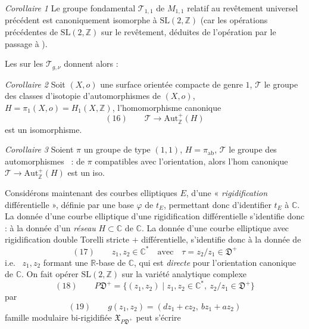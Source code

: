 \documentclass[11pt,a4paper]{article}
\begin{document}
\emph{Corollaire 1} Le groupe fondamental $\mathcal{T}_{1,1}$ de $M_{1,1}$
relatif au revêtement universel précédent est canoniquement isomorphe à
$\mathrm{SL}(2,\mathbb{Z})$ (car les opérations précédentes 
de $\mathrm{SL}(2,\mathbb{Z})$ sur le revêtement, déduites de l'opération
\ill{} par le passage à \ill{}).

Les \ill{} sur les $\mathcal{T}_{g,\nu}$ donnent alors :

\emph{Corollaire 2} Soit $(X, o)$ une surface orientée compacte de genre $1$,
$\mathcal{T}$ le groupe des classes d'isotopie d'automorphismes de $(X, o)$,
$H = \pi_1(X, o) = H_1(X, \mathbb{Z})$, 
 l'homomorphisme canonique
\[
(16)\qquad \mathcal{T} \longrightarrow \mathrm{Aut}^+_{\mathbb{Z}}(H)
\]
est un isomorphisme.

\emph{Corollaire 3} Soient $\pi$ un groupe \ill{} de type $(1,1)$,
$H = \pi_{\mathrm{ab}}$, $\mathcal{T}$ le groupe des automorphismes \ :
\ill{} de $\pi$ compatibles avec l'orientation, alors l'hom canonique
$\mathcal{T} \longrightarrow \mathrm{Aut}^+_{\mathbb{Z}}(H)$ est un iso.


Considérons maintenant des courbes elliptiques $E$, 
d'une « \emph{rigidification} différentielle », définie par une base
$\varphi$ de $t_E$, permettant donc d'identifier $t_E$ à $\mathbb{C}$. La donnée
d'une courbe elliptique  d'une rigidification différentielle
s'identifie donc : à la donnée d'un \emph{réseau} $H \subset \mathbb{C}$ de
$\mathbb{C}$. La donnée d'une courbe elliptique avec rigidification double Torelli
stricte $+$ différentielle, s'identifie donc à la donnée de
\[
(17)\qquad z_1, z_2 \in \mathbb{C}^* \quad \text{avec}\quad \tau = z_2/z_1 \in \mathfrak{D}^+
\]
i.e.\  $z_1, z_2$ formant \struck{\ill{}} une
$\mathbb{R}$-base de $\mathbb{C}$, qui est \emph{directe} pour l'orientation
canonique de $\mathbb{C}$. On fait opérer $\mathrm{SL}(2,\mathbb{Z})$  sur la variété analytique complexe
\[
(18)\qquad P\mathfrak{D}^+ = \{ (z_1, z_2) \mid z_1, z_2 \in \mathbb{C}^*,\ z_2/z_1 \in \mathfrak{D}^+ \}
\]
par
\[
(19)\qquad g(z_1, z_2) = (d z_1 + c z_2,\ b z_1 + a z_2)
\]
 famille modulaire bi-rigidifiée $\mathfrak{X}_{P\mathfrak{D}^+}$
peut s'écrire
\end{document}

